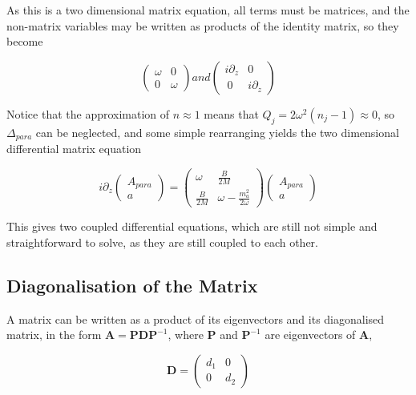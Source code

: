 \documentclass[12pt]{article}
\begin{document}
As this is a two dimensional matrix equation, all terms must be matrices, and the non-matrix variables may be written as products of the identity matrix, so they become

\begin{equation*}
\left( \begin{array}{ccc}
\omega & 0 \\
0 & \omega \end{array} \right) and 
\left( \begin{array}{ccc}
i\partial_z & 0 \\
\ 0 & i\partial_z \end{array} \right)
\end{equation*}

Notice that the approximation of $n\approx 1$ means that $Q_j = 2\omega^2(n_j-1)\approx 0$, so $\Delta_{para}$ can be neglected, and some simple rearranging yields the two dimensional differential matrix equation

\begin{equation}
i\partial_z \left( \begin{array}{ccc}
A_{para} \\
a \end{array} \right) = \left( \begin{array}{ccc}
\omega & \frac{B}{2M} \\
\frac{B}{2M} & \omega-\frac{m_a^2}{2\omega} \end{array} \right)
\left( \begin{array}{ccc}
A_{para} \\
a \end{array} \right)
\end{equation}

This gives two coupled differential equations, which are still not simple and straightforward to solve, as they are still coupled to each other. 

\subsection{Diagonalisation of the Matrix}

A matrix can be written as a product of its eigenvectors and its diagonalised matrix, in the form $\textbf{A} = \textbf{PDP}^{-1}$, where $\textbf{P}$ and $\textbf{P}^{-1}$ are eigenvectors of $\textbf{A}$, 

\begin{equation*}
\textbf{D} = \left( \begin{array}{ccc}
d_1 & 0 \\
0 & d_2 \end{array} \right)
\end{equation*}
\end{document}
